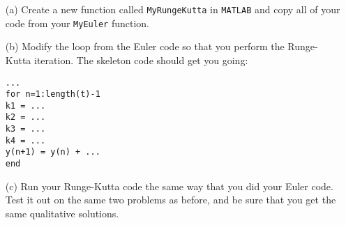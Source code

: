 % 
% 

\newpage

\begin{problem}
    \begin{enumerate}
        \item[(a)] Create a new function called \texttt{MyRungeKutta} in \texttt{MATLAB} and copy
            all of your code from your \texttt{MyEuler} function.
        \item[(b)] Modify the loop from the Euler code so that you perform the Runge-Kutta
            iteration.  The skeleton code should get you going:
\begin{lstlisting}
...
for n=1:length(t)-1
k1 = ...
k2 = ...
k3 = ...
k4 = ...
y(n+1) = y(n) + ...
end
\end{lstlisting}
        \item[(c)] Run your Runge-Kutta code the same way that you did your Euler code.  Test it
            out on the same two problems as before, and be sure that you get the same
            qualitative solutions.
    \end{enumerate}
\end{problem}


